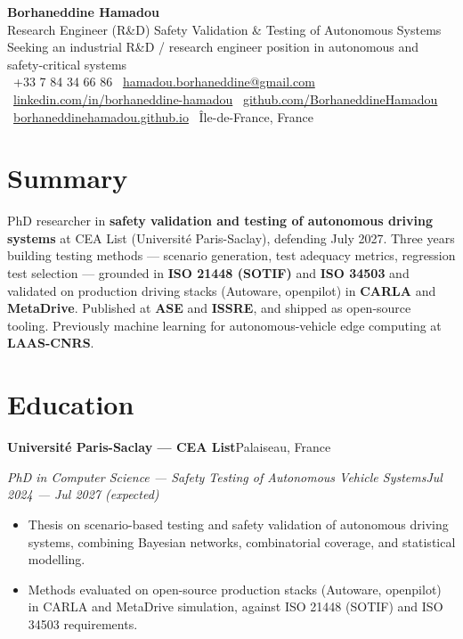 \documentclass[a4paper,10pt]{article}
\newcommand{\cvicon}[1]{{\small#1}~}
\newcommand{\cvicon}[1]{}
\newcommand{\cventry}[4]{%
  \vspace{3pt}%
  \begingroup\parfillskip=0pt\relax
    \textbf{#1}\hfill #2\par
    \textit{#3}\hfill \textit{#4}\par
  \endgroup
  \vspace{1pt}%
}
\newcommand{\cvsep}{\hspace{4pt}\textbar\hspace{4pt}}
\begin{document}
\begin{center}
  {\LARGE\bfseries\color{accent} Borhaneddine Hamadou}\\[4pt]
  {\large Research Engineer (R\&D) \textbar{} Safety Validation \& Testing of Autonomous Systems}\\[3pt]
  {\small Seeking an industrial R\&D / research engineer position in autonomous and safety-critical systems}\\[5pt]
  {\small
    \cvicon{\faPhone}+33 7 84 34 66 86 \cvsep
    \cvicon{\faEnvelope}\href{mailto:hamadou.borhaneddine@gmail.com}{hamadou.borhaneddine@gmail.com} \cvsep
    \cvicon{\faLinkedin}\href{https://www.linkedin.com/in/borhaneddine-hamadou-48272431b/}{linkedin.com/in/borhaneddine-hamadou} \cvsep
    \cvicon{\faGithub}\href{https://github.com/BorhaneddineHamadou}{github.com/BorhaneddineHamadou}\\[2pt]
    \cvicon{\faGlobe}\href{https://borhaneddinehamadou.github.io/}{borhaneddinehamadou.github.io} \cvsep
    \cvicon{\faMapMarkerAlt}\^Ile-de-France, France
  }
\end{center}
\vspace{-2pt}

\section*{Summary}

PhD researcher in \textbf{safety validation and testing of autonomous driving systems} at CEA List (Universit\'e Paris-Saclay), defending July 2027. Three years building testing methods --- scenario generation, test adequacy metrics, regression test selection --- grounded in \textbf{ISO 21448 (SOTIF)} and \textbf{ISO 34503} and validated on production driving stacks (Autoware, openpilot) in \textbf{CARLA} and \textbf{MetaDrive}. Published at \textbf{ASE} and \textbf{ISSRE}, and shipped as open-source tooling. Previously machine learning for autonomous-vehicle edge computing at \textbf{LAAS-CNRS}.

\section*{Education}

\cventry{Universit\'e Paris-Saclay --- CEA List}{Palaiseau, France}
      {PhD in Computer Science --- Safety Testing of Autonomous Vehicle Systems}{Jul 2024 --- Jul 2027 (expected)}
\begin{itemize}
  \item Thesis on scenario-based testing and safety validation of autonomous driving systems, combining Bayesian networks, combinatorial coverage, and statistical modelling.
  \item Methods evaluated on open-source production stacks (Autoware, openpilot) in CARLA and MetaDrive simulation, against ISO 21448 (SOTIF) and ISO 34503 requirements.
\end{itemize}
\end{document}
